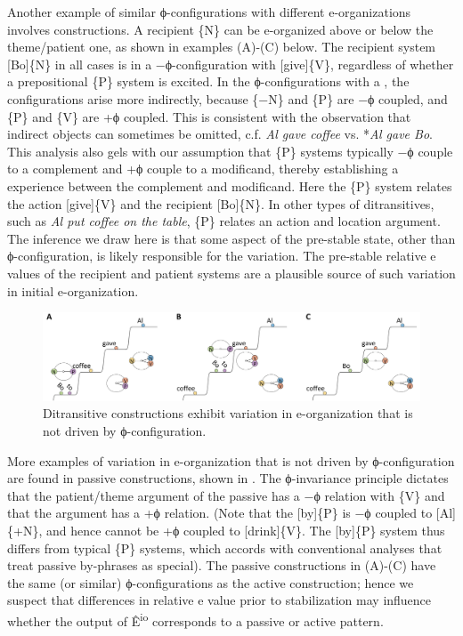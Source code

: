   Another example of similar ϕ-con\-fig\-u\-ra\-tions with different e-organizations involves  constructions. A recipient \{N\} can be e-organized above or below the theme/patient one, as shown in examples (A)-(C) below. The recipient system [Bo]\{N\} in all cases is in a −ϕ-con\-fig\-u\-ra\-tion with [give]\{V\}, regardless of whether a prepositional \{P\} system is excited. In the ϕ-con\-fig\-u\-ra\-tions with a , the configurations arise more indirectly, because \{−N\} and \{P\} are −ϕ coupled, and \{P\} and \{V\} are +ϕ coupled. This is consistent with the observation that indirect objects can sometimes be omitted, c.f. \textit{Al gave coffee} vs. *\textit{Al gave Bo}. This analysis also gels with our assumption that \{P\} systems typically −ϕ couple to a complement and +ϕ couple to a modificand, thereby establishing a  experience between the complement and modificand. Here the \{P\} system relates the action [give]\{V\} and the recipient [Bo]\{N\}. In other types of ditransitives, such as \textit{Al put coffee on the table}, \{P\} relates an action and location argument. The inference we draw here is that some aspect of the pre-stable state, other than ϕ-con\-fig\-u\-ra\-tion, is likely responsible for the variation. The pre-stable relative e values of the recipient and patient systems are a plausible source of such variation in initial e-organization.

  
\begin{figure}
\includegraphics[width=\textwidth]{figures/Tilsen-img80.png}
\caption{Ditransitive constructions exhibit variation in e-organization that is not driven by ϕ-con\-fig\-u\-ra\-tion.}
\label{fig:4:30}
\end{figure}
 

  More examples of variation in e-organization that is not driven by ϕ-con\-fig\-u\-ra\-tion are found in passive constructions, shown in {}. The ϕ-invariance principle dictates that the patient/theme argument of the passive has a −ϕ relation with \{V\} and that the  argument has a +ϕ relation. (Note that the  [by]\{P\} is −ϕ coupled to [Al]\{+N\}, and hence cannot be +ϕ coupled to [drink]\{V\}. The [by]\{P\} system thus differs from typical \{P\} systems, which accords with conventional analyses that treat passive by-phrases as special). The passive constructions in {}(A)-(C) have the same (or similar) ϕ-con\-fig\-u\-ra\-tions as the active construction; hence we suspect that differences in relative e value prior to stabilization may influence whether the output of Ê\textsuperscript{io} corresponds to a passive or active pattern.


